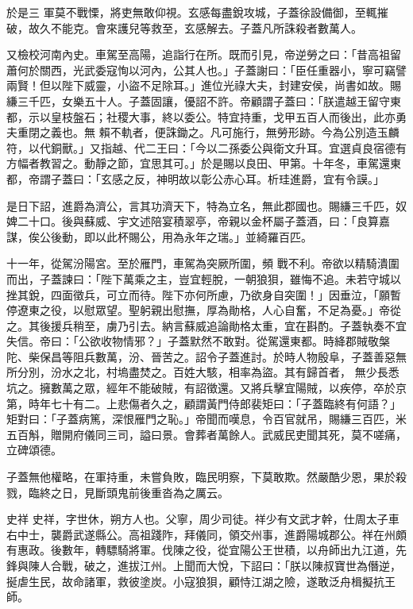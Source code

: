 \begin{pinyinscope}
 於是三
 軍莫不戰慄，將吏無敢仰視。玄感每盡銳攻城，子蓋徐設備御，至輒摧破，故久不能克。會來護兒等救至，玄感解去。子蓋凡所誅殺者數萬人。



 又檢校河南內史。車駕至高陽，追詣行在所。既而引見，帝逆勞之曰：「昔高祖留蕭何於關西，光武委寇恂以河內，公其人也。」子蓋謝曰：「臣任重器小，寧可竊譬兩賢！但以陛下威靈，小盜不足除耳。」進位光祿大夫，封建安侯，尚書如故。賜縑三千匹，女樂五十人。子蓋固讓，優詔不許。帝顧謂子蓋曰：「朕遣越王留守東都，示以皇枝盤石；社稷大事，終以委公。特宜持重，戈甲五百人而後出，此亦勇夫重閉之義也。無
 賴不軌者，便誅鋤之。凡可施行，無勞形跡。今為公別造玉麟符，以代銅獸。」又指越、代二王曰：「今以二孫委公與衛文升耳。宜選貞良宿德有方幅者教習之。動靜之節，宜思其可。」於是賜以良田、甲第。十年冬，車駕還東都，帝謂子蓋曰：「玄感之反，神明故以彰公赤心耳。析珪進爵，宜有令謨。」



 是日下詔，進爵為濟公，言其功濟天下，特為立名，無此郡國也。賜縑三千匹，奴婢二十口。後與蘇威、宇文述陪宴積翠亭，帝親以金杯屬子蓋酒，曰：「良算嘉謀，俟公後動，即以此杯賜公，用為永年之瑞。」並綺羅百匹。



 十一年，從駕汾陽宮。至於雁門，車駕為突厥所圍，頻
 戰不利。帝欲以精騎潰圍而出，子蓋諫曰：「陛下萬乘之主，豈宜輕脫，一朝狼狽，雖悔不追。未若守城以挫其銳，四面徵兵，可立而待。陛下亦何所慮，乃欲身自突圍！」因垂泣，「願暫停遼東之役，以慰眾望。聖躬親出慰撫，厚為勛格，人心自奮，不足為憂。」帝從之。其後援兵稍至，虜乃引去。納言蘇威追論勛格太重，宜在斟酌。子蓋執奏不宜失信。帝曰：「公欲收物情邪？」子蓋默然不敢對。從駕還東都。時絳郡賊敬槃陀、柴保昌等阻兵數萬，汾、晉苦之。詔令子蓋進討。於時人物殷阜，子蓋善惡無所分別，汾水之北，村塢盡焚之。百姓大駭，相率為盜。其有歸首者，
 無少長悉坑之。擁數萬之眾，經年不能破賊，有詔徵還。又將兵擊宜陽賊，以疾停，卒於京第，時年七十有二。上悲傷者久之，顧謂黃門侍郎裴矩曰：「子蓋臨終有何語？」矩對曰：「子蓋病篤，深恨雁門之恥。」帝聞而嘆息，令百官就吊，賜縑三百匹，米五百斛，贈開府儀同三司，謚曰景。會葬者萬餘人。武威民吏聞其死，莫不嗟痛，立碑頌德。



 子蓋無他權略，在軍持重，未嘗負敗，臨民明察，下莫敢欺。然嚴酷少恩，果於殺戮，臨終之日，見斷頭鬼前後重沓為之厲云。



 史祥
 史祥，字世休，朔方人也。父寧，周少司徒。祥少有文武才幹，仕周太子車右中士，襲爵武遂縣公。高祖踐阼，拜儀同，領交州事，進爵陽城郡公。祥在州頗有惠政。後數年，轉驃騎將軍。伐陳之役，從宜陽公王世積，以舟師出九江道，先鋒與陳人合戰，破之，進拔江州。上聞而大悅，下詔曰：「朕以陳叔寶世為僭逆，挻虐生民，故命諸軍，救彼塗炭。小寇狼狽，顧恃江湖之險，遂敢泛舟楫擬抗王師。




\end{pinyinscope}
